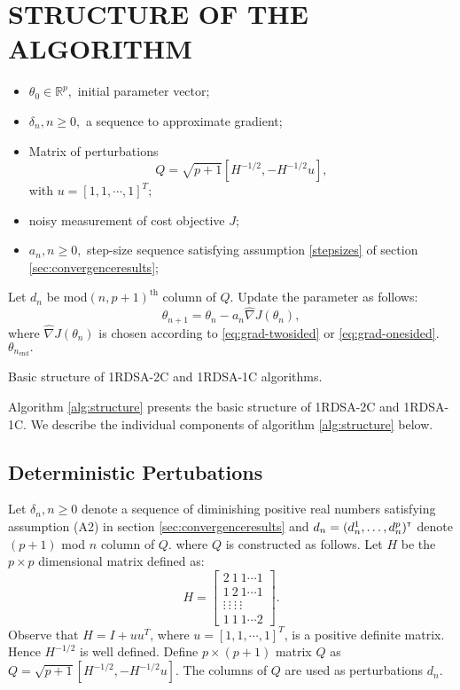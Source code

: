 \documentclass[letterpaper, 10 pt, conference]{ieeeconf}  %
\begin{document}
\section{STRUCTURE OF THE ALGORITHM}
\label{sec:algo}
\begin{algorithm}[t]
\begin{algorithmic}
\begin{itemize}
 \item $\theta_0 \in \mathbb{R}^p,$ initial parameter vector;
 \item $\delta_n, n \geq 0,$ a sequence to approximate gradient;
 \item Matrix of perturbations $$Q=\sqrt{p+1}[H^{-1/2},-H^{-1/2}u],$$ 
 with $u=[1,1,\cdots,1]^T;$
 \item noisy measurement of cost objective $J$;
 \item $a_n, n \geq 0,$ step-size sequence satisfying assumption \ref{stepsizes} of 
 section \ref{sec:convergenceresults};
\end{itemize}
	\State Let $d_n$ be mod$(n,p+1)^{\text{th}}$ column of $Q$. 
	\State Update the parameter as follows:
  \begin{equation}
  \theta_{n+1}=\theta_n-a_n \widehat\nabla J(\theta_n), \label{eq:algo}
  \end{equation}
where $\widehat\nabla J(\theta_n)$ is chosen according to \eqref{eq:grad-twosided} 
or \eqref{eq:grad-onesided}. 
\EndFor
{} $\theta_{n_{\text{end}}}.$
\end{algorithmic}
\caption{Basic structure of 1RDSA-2C and 1RDSA-1C algorithms.}
\label{alg:structure}
\end{algorithm}
Algorithm \ref{alg:structure} presents the basic structure of 
1RDSA-2C and 1RDSA-1C. We describe the individual 
components of algorithm \ref{alg:structure} below.
\subsection{Deterministic Pertubations}
Let $\delta_n, n\geq 0$ denote a sequence of diminishing positive real numbers satisfying 
assumption (A2) in section \ref{sec:convergenceresults} and 
$d_n = (d_n^1,\ldots,d_n^p)^\mathsf{\scriptscriptstyle T}$ denote $(p+1)$ mod $n$ column of $Q.$
where $Q$ is constructed as follows. 
Let $H$ be the $p \times p$ dimensional matrix defined as:
\begin{equation}\label{eq:H}
H = \left[\begin{array}{cccc}
2 \ 1 \ 1 \cdots 1\\ 
1 \ 2 \ 1 \cdots 1 \\
\vdots \ \vdots \ \vdots \ \vdots\\
1 \ 1 \ 1 \cdots 2
\end{array}\right].
\end{equation}
Observe that $H=I+uu^T$, where $u=[1,1,\cdots,1]^T$, is a positive definite matrix. Hence $H^{-1/2}$ is well defined.
Define $p\times (p+1)$ matrix $Q$ as $Q=\sqrt{p+1}[H^{-1/2},-H^{-1/2}u].$ The columns of
$Q$ are used as perturbations $d_n.$
\end{document}
